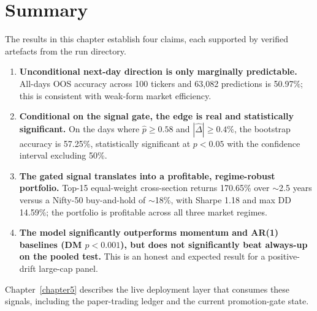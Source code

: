 \section{Summary}

The results in this chapter establish four claims, each supported by verified artefacts from the run directory.

\begin{enumerate}
    \item \textbf{Unconditional next-day direction is only marginally predictable.} All-days OOS accuracy across 100 tickers and 63{,}082 predictions is 50.97\%; this is consistent with weak-form market efficiency.
    \item \textbf{Conditional on the signal gate, the edge is real and statistically significant.} On the days where $\hat{p} \geq 0.58$ and $|\widehat{\Delta}| \geq 0.4\%$, the bootstrap accuracy is 57.25\%, statistically significant at $p<0.05$ with the confidence interval excluding 50\%.
    \item \textbf{The gated signal translates into a profitable, regime-robust portfolio.} Top-15 equal-weight cross-section returns 170.65\% over $\sim$2.5 years versus a Nifty-50 buy-and-hold of $\sim$18\%, with Sharpe 1.18 and max DD 14.59\%; the portfolio is profitable across all three market regimes.
    \item \textbf{The model significantly outperforms momentum and AR(1) baselines (DM $p<0.001$), but does not significantly beat always-up on the pooled test.} This is an honest and expected result for a positive-drift large-cap panel.
\end{enumerate}

Chapter~\ref{chapter5} describes the live deployment layer that consumes these signals, including the paper-trading ledger and the current promotion-gate state.
